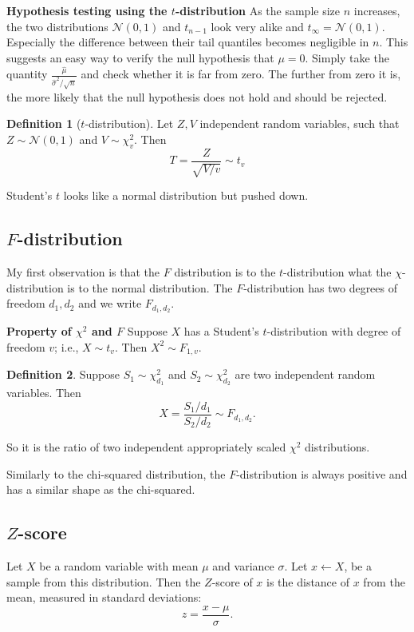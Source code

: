 \documentclass[11pt]{article}
\theoremstyle{definition}
\newtheorem{defn}{Definition}
\newcommand{\Normal}[2]{\ensuremath{\mathcal N (#1, #2)}}
\begin{document}
\begin{shaded}
	\textbf{Hypothesis testing using the $t$-distribution} \newline
    As the sample size $n$ increases, the two distributions $\Normal 0 1$ and
    $t_{n-1}$ look very alike and $t_\infty=\Normal 0 1$. Especially the
    difference between their tail quantiles becomes negligible in $n$.
    This suggests an easy way to verify the null hypothesis that $\mu=0$. Simply
    take the quantity $\frac{\hat\mu}{\hat\sigma^2/\sqrt n}$ and check whether
    it is far from zero. The further from zero it is, the more likely that the
    null hypothesis does not hold and should be rejected.
\end{shaded}


\begin{defn}[$t$-distribution]
	Let $Z,V$ independent random variables, such that $Z\sim\Normal 0 1$ and
	$V\sim\chi_v^2$. Then
	\[T=\frac{Z}{\sqrt{V/v}}\sim t_v\]
\end{defn}

Student's $t$ looks like a normal distribution but pushed down.

\subsection{$F$-distribution}
My first observation is that the $F$ distribution is to the $t$-distribution
what the $\chi$-distribution is to the normal distribution. The $F$-distribution
has two degrees of freedom $d_1,d_2$ and we write $F_{d_1,d_2}$.


\begin{shaded}
	\textbf{Property of $\chi^2$ and $F$} \newline
	Suppose $X$ has a Student's $t$-distribution with degree of freedom $v$;
	i.e., $X\sim t_v$. Then $X^2\sim F_{1,v}$.
\end{shaded}

\begin{defn}
    Suppose $S_1\sim\chi_{d_1}^2$ and $S_2\sim\chi_{d_2}^2$ are two independent
    random variables. Then 
    \[X=\frac{S_1/d_1}{S_2/d_2}\sim F_{d_1,d_2}.\]
\end{defn}
So it is the ratio of two independent appropriately scaled $\chi^2$ distributions.

Similarly to the chi-squared distribution, the $F$-distribution is always positive
and has a similar shape as the chi-squared.

\subsection{$Z$-score}
Let $X$ be a random variable with mean $\mu$ and variance $\sigma$. Let
$x\leftarrow X$, be a sample from this distribution. Then the $Z$-score of $x$
is the distance of $x$ from the mean, measured in standard deviations:
\[ z=\frac{x-\mu}{\sigma}.\]
\end{document}
